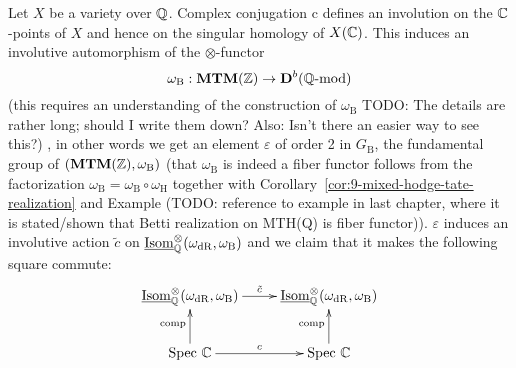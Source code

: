 Let $X$ be a variety over $\mathbb{Q}$. Complex conjugation $\mathrm{c}$
defines an involution on the $\mathbb{C}$-points of $X$ and hence on the
singular homology of $X(\mathbb{C})$. This induces an involutive automorphism
of the $\otimes$-functor 
\begin{equation*}
\omega_{\mathrm{B}}:\mathbf{MTM}(\mathbb{Z}) \to \mathbf{D}^b(\mathbb{Q}\text{-}\mathrm{mod})
\end{equation*}
(this requires an understanding of the construction of
$\omega_{\textrm{B}}$ TODO: The details are rather long; should I
write them down? Also: Isn't there an easier way to see
this?)%
, in other words we get an element $\varepsilon$ of order 2 in
$G_{\mathrm{B}}$, the fundamental group of
$(\mathbf{MTM}(\mathbb{Z}),\omega_{\mathrm{B}})$ (that $\omega_{\mathrm{B}}$ is indeed a fiber
functor follows from the factorization
$\omega_{\mathrm{B}}=\omega_{\mathrm{B}}\circ\omega_{\mathrm{H}}$
together with Corollary~\ref{cor:9-mixed-hodge-tate-realization} and
Example (TODO: reference to example in last chapter, where it is
stated/shown that Betti realization on MTH(Q) is fiber
functor)). %
$\varepsilon$ induces an involutive action $\tilde{c}$ on
$\underline{\mathrm{Isom}}_{\mathbb{Q}}^{\otimes}(\omega_{\mathrm{dR}},
\omega_{\mathrm{B}})$ and we claim that it makes the following square
commute:
\begin{equation*}
\xymatrix{
\underline{\mathrm{Isom}}_{\Q}^{\otimes}(\omega_{\mathrm{dR}}, \omega_{\mathrm{B}}) \ar[r]^{\tilde{c}} & \underline{\mathrm{Isom}}_{\Q}^{\otimes}(\omega_{\mathrm{dR}}, \omega_{\mathrm{B}}) \\
\spec \C \ar[r]^c \ar[u]^{\mathrm{comp}} & \spec \C \ar[u]^{\mathrm{comp}}}
\end{equation*}
